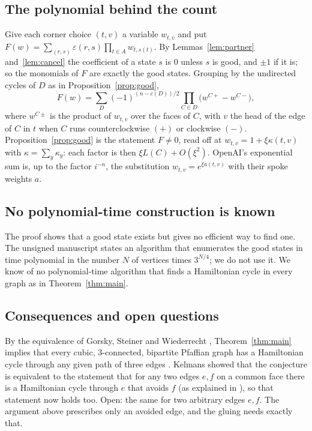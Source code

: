 \documentclass[10pt]{amsart}
\numberwithin{equation}{section}
\theoremstyle{definition}
\theoremstyle{remark}
\newcommand{\eps}{\varepsilon}
\begin{document}
\subsection*{The polynomial behind the count}
Give each corner choice $(t,v)$ a variable $w_{t,v}$ and put $F(w)=\sum_{(r,s)}\eps(r,s)\prod_{t\in A}w_{t,s(t)}$.
By Lemmas~\ref{lem:partner} and~\ref{lem:cancel} the coefficient of a state $s$ is $0$ unless $s$ is good, and $\pm1$ if it is; so the monomials of $F$ are exactly the good states.
Grouping by the undirected cycles of $D$ as in Proposition~\ref{prop:good},
\[
F(w)=\sum_{D}(-1)^{(n-c(D))/2}\prod_{C\in D}\bigl(w^{C+}-w^{C-}\bigr),
\]
where $w^{C\pm}$ is the product of $w_{t,v}$ over the faces of $C$, with $v$ the head of the edge of $C$ in $t$ when $C$ runs counterclockwise $(+)$ or clockwise $(-)$.
Proposition~\ref{prop:good} is the statement $F\neq0$, read off at $w_{t,v}=1+\xi\kappa(t,v)$ with $\kappa=\sum_y\kappa_y$: each factor is then $\xi L(C)+O(\xi^2)$.
OpenAI's exponential sum is, up to the factor $i^{-n}$, the substitution $w_{t,v}=e^{\xi a(t,v)}$ with their spoke weights $a$.

\subsection*{No polynomial-time construction is known}
The proof shows that a good state exists but gives no efficient way to find one.
The unsigned manuscript \cite{constructive2026} states an algorithm that enumerates the good states in time polynomial in the number $N$ of vertices times $3^{N/4}$; we do not use it.
We know of no polynomial-time algorithm that finds a Hamiltonian cycle in every graph as in Theorem~\ref{thm:main}.

\subsection*{Consequences and open questions}
By the equivalence of Gorsky, Steiner and Wiederrecht \cite[Theorem~4.16]{gsw2023}, Theorem~\ref{thm:main} implies that every cubic, $3$-connected, bipartite Pfaffian graph has a Hamiltonian cycle through any given path of three edges \cite[Corollary~7.2]{openai2026}.
Kelmans showed that the conjecture is equivalent to the statement that for any two edges $e,f$ on a common face there is a Hamiltonian cycle through $e$ that avoids $f$ (as explained in \cite{hertel2005,apsw2016}), so that statement now holds too.
Open: the same for two arbitrary edges $e,f$.
The argument above prescribes only an avoided edge, and the gluing needs exactly that.



\end{document}
